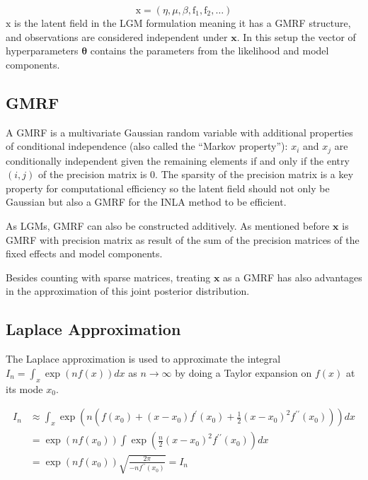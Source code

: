 \documentclass[
]{book}
\begin{document}
\[\mathrm{x}=\left(\eta, \mu, \beta, \mathrm{f}_1, \mathrm{f}_2, \ldots\right)\]
\(\mathrm{x}\) is the latent field in the LGM formulation meaning it has a GMRF structure, and observations are considered independent under \(\mathbf{x}\). In this setup the vector of hyperparameters \(\mathbf{\theta}\) contains the parameters from the likelihood and model components.

\hypertarget{gmrf}{%
\subsection*{GMRF}\label{gmrf}}

A GMRF is a multivariate Gaussian random variable with additional properties of conditional independence (also called the ``Markov property''): \(x_i\) and \(x_j\) are conditionally independent given the remaining elements if and only if the entry \((i,j)\) of the precision matrix is 0. The sparsity of the precision matrix is a key property for computational efficiency so the latent field should not only be Gaussian but also a GMRF for the INLA method to be efficient.

As LGMs, GMRF can also be constructed additively. As mentioned before \(\mathbf{x}\) is GMRF with precision matrix as result of the sum of the precision matrices of the fixed effects and model components.

Besides counting with sparse matrices, treating \(\mathbf{x}\) as a GMRF has also advantages in the approximation of this joint posterior distribution.

\hypertarget{laplace-approximation}{%
\subsection*{Laplace Approximation}\label{laplace-approximation}}

The Laplace approximation is used to approximate the integral \(I_n=\int_x \exp (n f(x)) d x\) as \(n{\rightarrow}\infty\) by doing a Taylor expansion on \(f(x)\) at its mode \(x_0\).

\[\begin{aligned}
I_n & \approx \int_x \exp \left(n\left(f\left(x_0\right)+\left(x-x_0\right) f^{\prime}\left(x_0\right)+\frac{1}{2}\left(x-x_0\right)^2 f^{\prime \prime}\left(x_0\right)\right)\right) d x \\
& =\exp \left(n f\left(x_0\right)\right) \int \exp \left(\frac{n}{2}\left(x-x_0\right)^2 f^{\prime \prime}\left(x_0\right)\right) d x \\
& =\exp \left(n f\left(x_0\right)\right) \sqrt{\frac{2 \pi}{-n f^{\prime \prime}\left(x_0\right)}}=I_n
\end{aligned}\]
\end{document}
